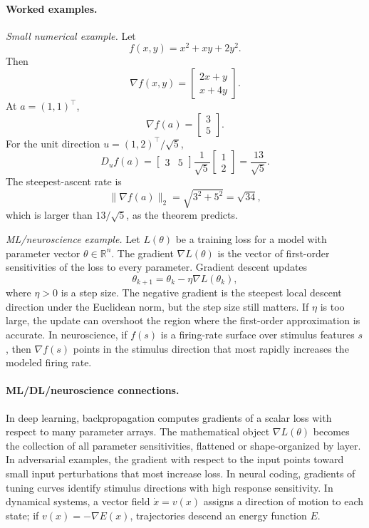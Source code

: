 \paragraph{Worked examples.}
\emph{Small numerical example.} Let
\[
f(x,y)=x^2+xy+2y^2.
\]
Then
\[
\nabla f(x,y)=
\begin{bmatrix}
2x+y\\
x+4y
\end{bmatrix}.
\]
At \(a=(1,1)^\top\),
\[
\nabla f(a)=
\begin{bmatrix}3\\5\end{bmatrix}.
\]
For the unit direction \(u=(1,2)^\top/\sqrt{5}\),
\[
D_u f(a)
=
\begin{bmatrix}3&5\end{bmatrix}
\frac{1}{\sqrt{5}}
\begin{bmatrix}1\\2\end{bmatrix}
=\frac{13}{\sqrt{5}}.
\]
The steepest-ascent rate is
\[
\|\nabla f(a)\|_2=\sqrt{3^2+5^2}=\sqrt{34},
\]
which is larger than \(13/\sqrt{5}\), as the theorem predicts.

\emph{ML/neuroscience example.} Let \(L(\theta)\) be a training loss for a model with parameter vector \(\theta\in\mathbb{R}^n\). The gradient \(\nabla L(\theta)\) is the vector of first-order sensitivities of the loss to every parameter. Gradient descent updates
\[
\theta_{k+1}=\theta_k-\eta\nabla L(\theta_k),
\]
where \(\eta>0\) is a step size. The negative gradient is the steepest local descent direction under the Euclidean norm, but the step size still matters. If \(\eta\) is too large, the update can overshoot the region where the first-order approximation is accurate. In neuroscience, if \(f(s)\) is a firing-rate surface over stimulus features \(s\), then \(\nabla f(s)\) points in the stimulus direction that most rapidly increases the modeled firing rate.

\paragraph{ML/DL/neuroscience connections.}
In deep learning, backpropagation computes gradients of a scalar loss with respect to many parameter arrays. The mathematical object \(\nabla L(\theta)\) becomes the collection of all parameter sensitivities, flattened or shape-organized by layer. In adversarial examples, the gradient with respect to the input points toward small input perturbations that most increase loss. In neural coding, gradients of tuning curves identify stimulus directions with high response sensitivity. In dynamical systems, a vector field \(\dot{x}=v(x)\) assigns a direction of motion to each state; if \(v(x)=-\nabla E(x)\), trajectories descend an energy function \(E\).

